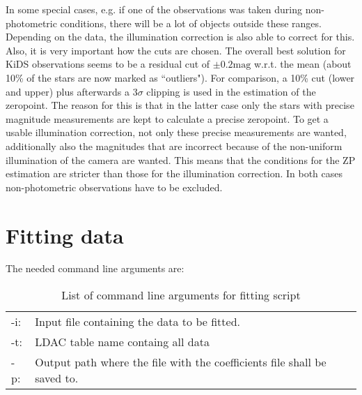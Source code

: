 In some special cases, e.g. if one of the observations was taken during non-photometric conditions, there will be a lot of objects outside these ranges. Depending on the data, the illumination correction is also able to correct for this.\\
Also, it is very important how the cuts are chosen. The overall best solution for KiDS observations seems to be a residual cut of $\pm 0.2\text{mag}$ w.r.t. the mean (about 10\% of the stars are now marked as ``outliers"). For comparison, a 10\% cut (lower and upper) plus afterwards a 3$\sigma$ clipping is used in the estimation of the zeropoint. The reason for this is that in the latter case only the stars with precise magnitude measurements are kept to calculate a precise zeropoint. To get a usable illumination correction, not only these precise measurements are wanted, additionally also the magnitudes that are incorrect because of the non-uniform illumination of the camera are wanted. This means that the conditions for the ZP estimation are stricter than those for the illumination correction. In both cases non-photometric observations have to be excluded.
















\section{Fitting data}
\label{sec:IllumCorrectionFitting}
The needed command line arguments are:
\begin{table}[H]
\centering
\begin{tabular}{lp{11.5cm}}
-i: & Input file containing the data to be fitted.\\
-t: & LDAC table name containg all data\\
-p: & Output path where the file with the coefficients file shall be saved to.\\
\end{tabular}
\caption{List of command line arguments for fitting script}
\label{tab:CommandLineArgumentsFittingScript}
\end{table}

